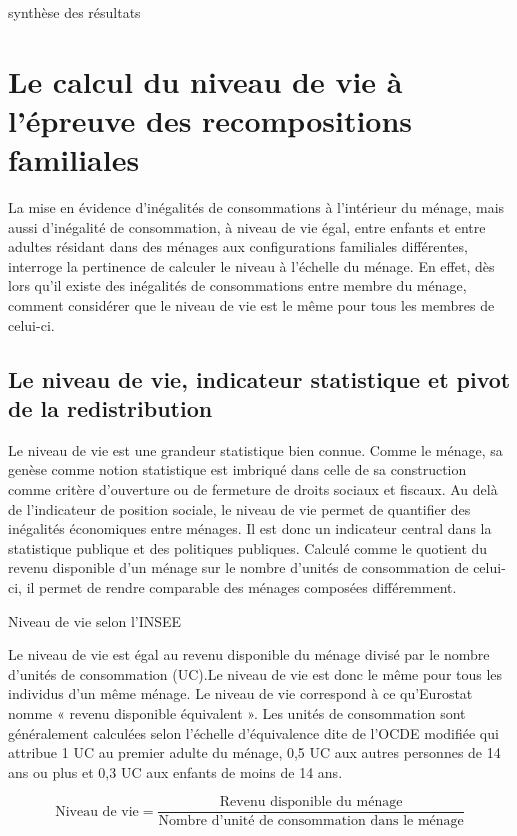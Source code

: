 \documentclass[
  12pt,
]{book}
\begin{document}
synthèse des résultats

\section{Le calcul du niveau de vie à l'épreuve des recompositions
familiales}\label{le-calcul-du-niveau-de-vie-uxe0-luxe9preuve-des-recompositions-familiales}

La mise en évidence d'inégalités de consommations à l'intérieur du
ménage, mais aussi d'inégalité de consommation, à niveau de vie égal,
entre enfants et entre adultes résidant dans des ménages aux
configurations familiales différentes, interroge la pertinence de
calculer le niveau à l'échelle du ménage. En effet, dès lors qu'il
existe des inégalités de consommations entre membre du ménage, comment
considérer que le niveau de vie est le même pour tous les membres de
celui-ci.

\subsection{Le niveau de vie, indicateur statistique et pivot de la
redistribution}\label{le-niveau-de-vie-indicateur-statistique-et-pivot-de-la-redistribution}

Le niveau de vie est une grandeur statistique bien connue. Comme le
ménage, sa genèse comme notion statistique est imbriqué dans celle de sa
construction comme critère d'ouverture ou de fermeture de droits sociaux
et fiscaux. Au delà de l'indicateur de position sociale, le niveau de
vie permet de quantifier des inégalités économiques entre ménages. Il
est donc un indicateur central dans la statistique publique et des
politiques publiques. Calculé comme le quotient du revenu disponible
d'un ménage sur le nombre d'unités de consommation de celui-ci, il
permet de rendre comparable des ménages composées différemment.

\begin{encadre}{Niveau de vie selon l'INSEE}

Le niveau de vie est égal au revenu disponible du ménage divisé par le
nombre d'unités de consommation (UC).Le niveau de vie est donc le même pour tous les individus d'un même ménage. Le niveau de vie correspond à ce qu’Eurostat nomme « revenu disponible équivalent ». Les unités de consommation sont généralement calculées selon l'échelle d'équivalence dite de l'OCDE modifiée qui attribue 1 UC au premier adulte du ménage, 0,5 UC aux autres personnes de 14 ans ou plus et 0,3 UC aux enfants de moins de 14 ans.

$$
\text{Niveau de vie} = \frac{\text{Revenu disponible du ménage}}{\text{Nombre d'unité de consommation dans le ménage}}
$$

\end{encadre}
\end{document}
